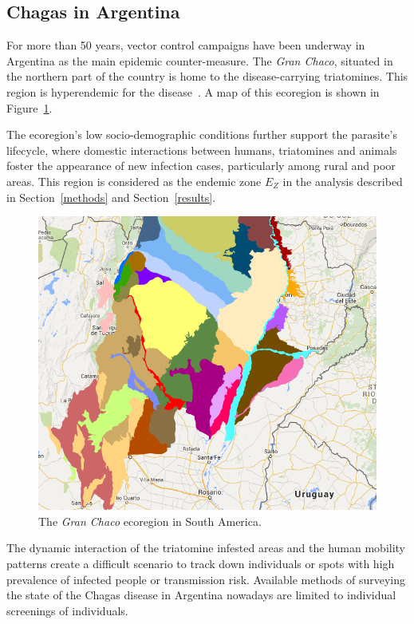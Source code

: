 \subsection{Chagas in  Argentina}\label{endemic_zone_argentina}

For more than 50 years, vector control campaigns have been underway in Argentina as the main epidemic counter-measure. The \textit{Gran Chaco}, situated in the northern part of the country is home to the disease-carrying triatomines. This region is hyperendemic for the disease~\cite{OPS2014mapa}. A map of this ecoregion is shown in Figure~\ref{fig:granchaco}.

The ecoregion's low socio-demographic conditions further support the parasite's lifecycle, where domestic interactions between humans, triatomines and animals foster the appearance of new infection cases, particularly among rural and poor areas.
This region is considered as the endemic zone $E_Z$ in the analysis described in Section~\ref{methods} and Section~\ref{results}.

\begin{figure}[h!]
\centering
\includegraphics[width=0.75\columnwidth]{figures/Ambientes_GranChaco_TNC-Argentina/Ambientes_GranChaco_TNC-Argentina.png}
\caption{The \textit{Gran Chaco} ecoregion in South America.%
}
\label{fig:granchaco}
\end{figure}


The dynamic interaction of the triatomine infested areas and the human mobility patterns create a difficult scenario to track down individuals or spots with high prevalence of infected people or transmission risk. Available methods of surveying the state of the Chagas disease in Argentina nowadays are limited to individual screenings of individuals. %

